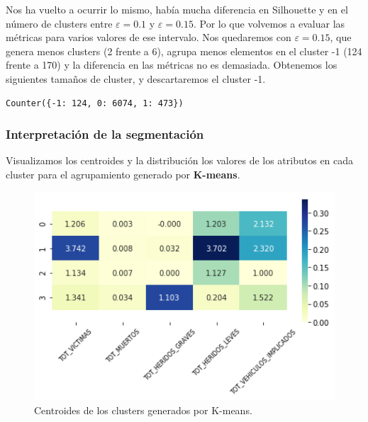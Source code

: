 \documentclass[oneside]{book}
\begin{document}
Nos ha vuelto a ocurrir lo mismo, había mucha diferencia en Silhouette
y en el número de clusters entre $\varepsilon=0.1$ y
$\varepsilon=0.15$. Por lo que volvemos a evaluar las métricas para
varios valores de ese intervalo. Nos quedaremos con
$\varepsilon=0.15$, que genera menos clusters (2 frente a 6), agrupa
menos elementos en el cluster -1 (124 frente a 170) y la diferencia en
las métricas no es demasiada. Obtenemos los siguientes tamaños de
cluster, y descartaremos el cluster -1.
\begin{verbatim}
Counter({-1: 124, 0: 6074, 1: 473})
\end{verbatim}

\subsubsection{Interpretación de la segmentación}

Visualizamos los centroides y la distribución los valores de los
atributos en cada cluster para el agrupamiento generado por
\textbf{K-means}.

\begin{figure}[H]
  \centering
  \includegraphics[width=120mm]{figures/accidentes/k-means3centroids}
  \caption{Centroides de los clusters generados por K-means.}
  \label{fig:k-means3centroids}
\end{figure}
\end{document}
